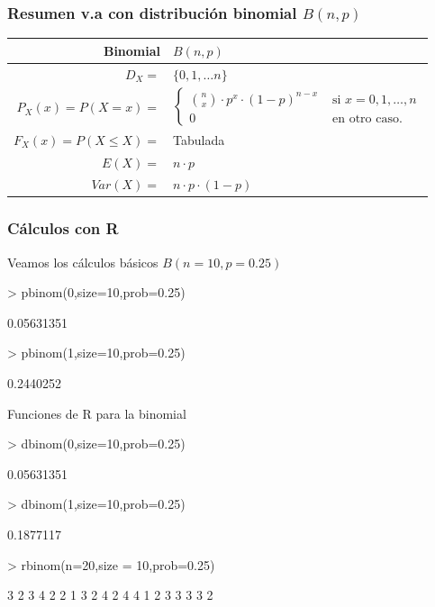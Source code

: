 \documentclass[handout]{beamer}
\renewcommand{\leq}{\leqslant}
\theoremstyle{plain}
\theoremstyle{definition}
\begin{document}
\begin{frame}

\frametitle{Resumen v.a con distribución binomial $B(n,p)$}
\scriptsize
\begin{table}
\centering
\begin{tabular}{|rl|}
\hline 
\textbf{Binomial} & $B(n,p)$\\
\hline \hline 
$D_X=$&  $\{0,1,\ldots n\}$ \\\hline 
$P_X(x)=P(X=x)=$ & 
$\left\{
\begin{array}{ll}
{n\choose x}\cdot  p^x\cdot  (1-p)^{n-x} & \mbox{ si } x=0,1,\ldots,n\\
     0  & \mbox{ en otro caso.}
\end{array}
\right.$
\\ \hline 
$F_X(x)=P(X\leq X)=$ & Tabulada \\\hline 
$E(X)=$ &  $n\cdot p$\\
$Var(X)=$ & $n\cdot p \cdot (1-p)$\\
\hline
\end{tabular}
\end{table}
\normalsize
\end{frame}

\begin{frame}[fragile]
\frametitle{Cálculos con R}
Veamos los cálculos básicos $B(n=10,p=0.25)$

\begin{Schunk}
\begin{Sinput}
> pbinom(0,size=10,prob=0.25)
\end{Sinput}
\begin{Soutput}
[1] 0.05631351
\end{Soutput}
\begin{Sinput}
> pbinom(1,size=10,prob=0.25)
\end{Sinput}
\begin{Soutput}
[1] 0.2440252
\end{Soutput}
\end{Schunk}

\end{frame}

\begin{frame}[fragile]
Funciones de R para la binomial 

\begin{Schunk}
\begin{Sinput}
> dbinom(0,size=10,prob=0.25)
\end{Sinput}
\begin{Soutput}
[1] 0.05631351
\end{Soutput}
\begin{Sinput}
> dbinom(1,size=10,prob=0.25)
\end{Sinput}
\begin{Soutput}
[1] 0.1877117
\end{Soutput}
\begin{Sinput}
> rbinom(n=20,size = 10,prob=0.25)
\end{Sinput}
\begin{Soutput}
 [1] 3 2 3 4 2 2 1 3 2 4 2 4 4 1 2 3 3 3 3 2
\end{Soutput}
\end{Schunk}

\end{frame}
\end{document}

